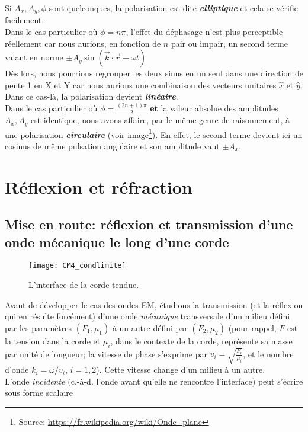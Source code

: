 Si $A_{x},A_{y}, \phi$ 
sont quelconques, la polarisation est dite
 \textit{\textbf{elliptique}}
et cela se vérifie facilement.\\
Dans le cas particulier où $\phi = n \pi$, l'effet du déphasage n'est plus perceptible réellement car nous aurions, en fonction 
de $n$ pair ou impair, un second terme valant en norme $\pm A_{y} \sin(\vec{k}\cdot \vec{r} - \omega t)$ \\
Dès lors, nous pourrions regrouper les deux sinus en un seul dans une direction de pente 1 en X et Y car nous aurions une combinaison 
des vecteurs unitaires $\hat{x}$ et $\hat{y}$. Dans ce cas-là, la polarisation devient \textit{\textbf{linéaire}}. \\
Dans le cas particulier où $\phi = \frac{(2n+1) \pi }{2}$ \textbf{et} la valeur absolue des amplitudes $A_{x}, A_{y}$ est identique, 
nous avons affaire, par le même genre de raisonnement, à une polarisation \textit{\textbf{circulaire}} (voir image\footnote{Source: \url{https://fr.wikipedia.org/wiki/Onde_plane}}). 
En effet, le second terme devient ici un cosinus de même pulsation angulaire et son amplitude vaut $\pm A_{x}$. 


\section{Réflexion et réfraction} 

\subsection{Mise en route: réflexion et transmission d'une onde mécanique le long d'une corde} 

\begin{figure*}
	\texttt{[image: CM4\_condlimite]}
	\caption{L'interface de la corde tendue.}
\end{figure*}
Avant de développer le cas des ondes EM, étudions la transmission (et la réflexion qui en résulte forcément) d'une onde \textit{mécanique} transversale d'un milieu défini par les paramètres $({F}_1,{\mu_1})$ à un autre défini par $({F}_2,{\mu_2})$ (pour rappel, $F$ est la tension dans la corde et $\mu_i$, dans le contexte de la corde, représente sa masse par unité de longueur; la vitesse de phase s'exprime par $v_i = \sqrt{\frac{F_i}{\mu_i}}$, et le nombre d'onde $k_i = \omega/v_i$, $i = 1, 2$). Cette vitesse change d'un milieu à un autre.\\
L'onde \textit{incidente} (c.-à-d. l'onde avant qu'elle ne rencontre l'interface) peut s'écrire sous forme scalaire

